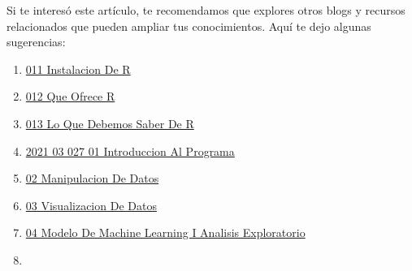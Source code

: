 \documentclass[
  jou,
  floatsintext,
  longtable,
  a4paper,
  nolmodern,
  notxfonts,
  notimes,
  colorlinks=true,linkcolor=blue,citecolor=blue,urlcolor=blue]{apa7}
\providecommand{\tightlist}{%
  \setlength{\itemsep}{0pt}\setlength{\parskip}{0pt}}
\begin{document}
Si te interesó este artículo, te recomendamos que explores otros blogs y
recursos relacionados que pueden ampliar tus conocimientos. Aquí te dejo
algunas sugerencias:

\begin{enumerate}
\def\labelenumi{\arabic{enumi}.}
\tightlist
\item
  \href{https://achalmaedison.netlify.app/programacion-software/r/2020-06-10-011-instalacion-de-r/index.pdf}{}
  \href{https://achalmaedison.netlify.app/programacion-software/r/2020-06-10-011-instalacion-de-r}{011
  Instalacion De R}
\item
  \href{https://achalmaedison.netlify.app/programacion-software/r/2020-06-10-012-que-ofrece-r/index.pdf}{}
  \href{https://achalmaedison.netlify.app/programacion-software/r/2020-06-10-012-que-ofrece-r}{012
  Que Ofrece R}
\item
  \href{https://achalmaedison.netlify.app/programacion-software/r/2020-06-10-013-lo-que-debemos-saber-de-r/index.pdf}{}
  \href{https://achalmaedison.netlify.app/programacion-software/r/2020-06-10-013-lo-que-debemos-saber-de-r}{013
  Lo Que Debemos Saber De R}
\item
  \href{https://achalmaedison.netlify.app/programacion-software/r/2021-03-027-01-introduccion-al-programa/index.pdf}{}
  \href{https://achalmaedison.netlify.app/programacion-software/r/2021-03-027-01-introduccion-al-programa}{2021
  03 027 01 Introduccion Al Programa}
\item
  \href{https://achalmaedison.netlify.app/programacion-software/r/2021-04-05-02-manipulacion-de-datos/index.pdf}{}
  \href{https://achalmaedison.netlify.app/programacion-software/r/2021-04-05-02-manipulacion-de-datos}{02
  Manipulacion De Datos}
\item
  \href{https://achalmaedison.netlify.app/programacion-software/r/2021-04-12-03-visualizacion-de-datos/index.pdf}{}
  \href{https://achalmaedison.netlify.app/programacion-software/r/2021-04-12-03-visualizacion-de-datos}{03
  Visualizacion De Datos}
\item
  \href{https://achalmaedison.netlify.app/programacion-software/r/2022-11-07-04-modelo-de-machine-learning-i-analisis-exploratorio/index.pdf}{}
  \href{https://achalmaedison.netlify.app/programacion-software/r/2022-11-07-04-modelo-de-machine-learning-i-analisis-exploratorio}{04
  Modelo De Machine Learning I Analisis Exploratorio}
\item

\end{enumerate}
\end{document}
